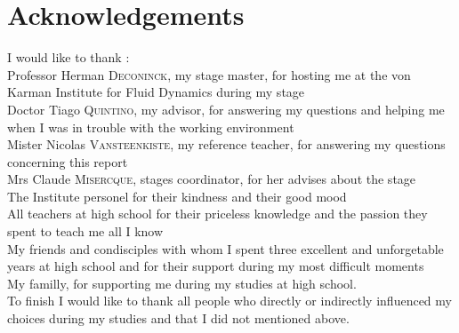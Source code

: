 \chapter*{Acknowledgements}

I would like to thank : \\

Professor Herman \textsc{Deconinck}, my stage master, for hosting me at
the von Karman Institute for Fluid Dynamics during my stage\\

Doctor Tiago \textsc{Quintino}, my advisor, for answering my questions
and helping me when I was in trouble with the working environment\\

Mister Nicolas \textsc{Vansteenkiste}, my reference teacher, for
answering my questions concerning this report\\

Mrs Claude \textsc{Misercque}, stages coordinator, for her advises about
the stage\\

The Institute personel for their kindness and their good mood\\

All teachers at high school for their priceless knowledge and the
passion they spent to teach me all I know\\

My friends and condisciples with whom I spent three excellent and
unforgetable years at high school and for their support during my most
difficult moments\\

My familly, for supporting me during my studies at high school. \\

To finish I would like to thank all people who directly or indirectly
influenced my choices during my studies and that I did not mentioned above.
